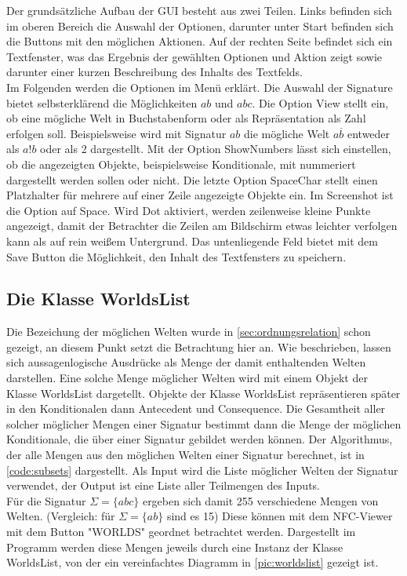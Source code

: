 \documentclass[12pt,a4paper]{article}
\begin{document}
Der grundsätzliche Aufbau der GUI besteht aus zwei Teilen. Links befinden sich im oberen Bereich die Auswahl der Optionen, darunter unter Start befinden sich die Buttons mit den möglichen Aktionen. Auf der rechten Seite befindet sich ein Textfenster, was das Ergebnis der gewählten Optionen und Aktion zeigt sowie darunter einer kurzen Beschreibung des Inhalts des Textfelds. \\
Im Folgenden werden die Optionen im Menü erklärt. Die Auswahl der Signature bietet selbsterklärend die Möglichkeiten $ab$ und $abc$. Die Option View stellt ein, ob eine mögliche Welt in Buchstabenform oder als Repräsentation als Zahl erfolgen soll. Beispielsweise wird mit Signatur $ab$ die mögliche Welt $a \overline{b}$ entweder als $a!b$ oder als 2 dargestellt. Mit der Option ShowNumbers lässt sich einstellen, ob die angezeigten Objekte, beispielsweise Konditionale, mit nummeriert dargestellt werden sollen oder nicht. Die letzte Option SpaceChar stellt einen Platzhalter für mehrere auf einer Zeile angezeigte Objekte ein. Im Screenshot ist die Option auf Space. Wird Dot aktiviert, werden zeilenweise kleine Punkte angezeigt, damit der Betrachter die Zeilen am Bildschirm etwas leichter verfolgen kann als auf rein weißem Untergrund. Das untenliegende Feld bietet mit dem Save Button die Möglichkeit, den Inhalt des Textfensters zu speichern.

\subsection{Die Klasse WorldsList}
\label{sec:worldslist}
Die Bezeichung der möglichen Welten wurde in \autoref{sec:ordnungsrelation} schon gezeigt, an diesem Punkt setzt die Betrachtung hier an. Wie beschrieben, lassen sich aussagenlogische Ausdrücke als Menge der damit enthaltenden Welten darstellen. Eine solche Menge möglicher Welten wird mit einem Objekt der Klasse WorldsList dargetellt. Objekte der Klasse WorldsList repräsentieren später in den Konditionalen dann Antecedent und Consequence. Die Gesamtheit aller solcher möglicher Mengen einer Signatur bestimmt dann die Menge der möglichen Konditionale, die über einer Signatur gebildet werden können. Der Algorithmus, der alle Mengen aus den möglichen Welten einer Signatur berechnet, ist in \autoref{code:subsets} dargestellt. Als Input wird die Liste möglicher Welten der Signatur verwendet, der Output ist eine Liste aller Teilmengen des Inputs. \\
Für die Signatur $\Sigma = \{abc\}$ ergeben sich damit 255 verschiedene Mengen von Welten. (Vergleich: für $\Sigma=\{ab\}$ sind es 15) Diese können mit dem NFC-Viewer mit dem Button "WORLDS" \space geordnet betrachtet werden. Dargestellt im Programm werden diese Mengen jeweils durch eine Instanz der Klasse WorldsList, von der ein vereinfachtes Diagramm in \ref{pic:worldslist} gezeigt ist. 
\end{document}
